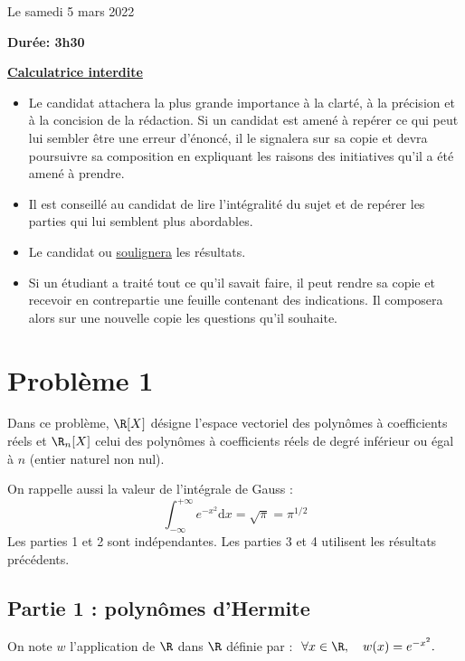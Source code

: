 \documentclass[twoside,french,11pt]{VcCours}
\newcommand{\dx}{\text{d}x}
\begin{document}

\begin{center}
\large 
Le samedi 5 mars 2022

\bigskip
\textbf{Durée: 3h30}

\bigskip
\large\underline{\textbf{Calculatrice interdite}}
\end{center}

\bigskip
\begin{itemize}
  \item Le candidat attachera la plus grande importance à la clarté, à la précision et à la concision de la rédaction. Si un candidat est amené à repérer ce qui peut lui sembler être une erreur d'énoncé, il le signalera sur sa copie et devra poursuivre sa composition en expliquant les raisons des initiatives qu'il a été amené à prendre.
  \item Il est conseillé au candidat de lire l'intégralité du sujet et de repérer les parties qui lui semblent plus abordables.
  \item Le candidat  ou \underline{soulignera} les résultats.
  \item Si un étudiant a traité tout ce qu'il savait faire, il peut rendre sa copie et recevoir en contrepartie une feuille
  contenant des indications. Il composera alors sur une nouvelle copie les questions qu'il souhaite.
  \end{itemize}
\separationTitre

\section*{Problème 1}

Dans ce problème, $\R[X]$ désigne l'espace vectoriel des polynômes à coefficients réels et $\R_n[X]$ celui des polynômes à coefficients réels de degré inférieur ou égal à $n$ (entier naturel non nul).

\medskip
On rappelle aussi la valeur de l'intégrale de Gauss :
$$\int_{-\infty}^{+\infty}e^{-x^2} \dx=\sqrt{\pi}=\pi^{1/2}$$
Les parties 1 et 2 sont indépendantes. Les parties 3 et 4 utilisent les résultats précédents.

\subsection*{Partie 1 : polynômes d'Hermite}

On note $w$ l'application de $\R$ dans $\R$ définie par :
$\ \forall x\in\R,\quad w(x)=e^{-x^2}.$
\end{document}
